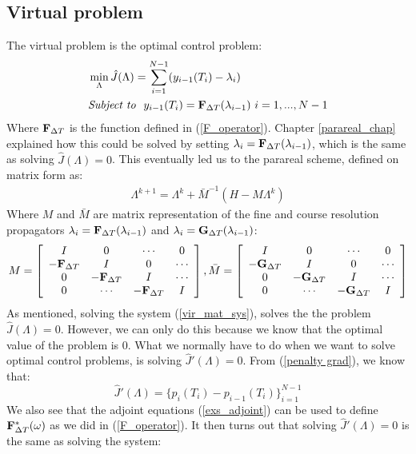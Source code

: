\subsection{Virtual problem}
The virtual problem is the optimal control problem:
\begin{align}
&\min_{\Lambda}\hat{J}(\Lambda) = \sum_{i=1}^{N-1} (y_{i-1}(T_{i})-\lambda_{i}) \label{virtual_func} \\
&\textit{Subject to } \ y_{i-1}(T_{i}) = \bold F_{\Delta T}(\lambda_{i-1}) \ i=1,...,N-1 \label{virtual}
\end{align}
Where $\bold F_{\Delta T}$ is the function defined in (\ref{F_operator}). Chapter \ref{parareal_chap} explained how this could be solved by setting $\lambda_i= \bold F_{\Delta T}(\lambda_{i-1})$, which is the same as solving $\hat{J}(\Lambda)=0$. This eventually led us to the parareal scheme, defined on matrix form as:
\begin{align*}
\Lambda^{k+1} = \Lambda^k + \bar{M}^{-1}(H-M\Lambda^k)
\end{align*}
Where $M$ and $\bar{M}$ are matrix representation of the fine and course resolution propagators $\lambda_i= \bold F_{\Delta T}(\lambda_{i-1})$ and  $\lambda_i= \bold G_{\Delta T}(\lambda_{i-1})$:
\begin{align*}
M = \left[ \begin{array}{cccc}
   I & 0 & \cdots & 0 \\  
   -\bold{F}_{\Delta T} & I & 0 & \cdots \\ 
   0 &-\bold{F}_{\Delta T} & I  & \cdots \\
   0 &\cdots &-\bold{F}_{\Delta T} & I   \\
   \end{array}  \right],
\bar{M} = \left[ \begin{array}{cccc}
   I & 0 & \cdots & 0 \\  
   -\bold{G}_{\Delta T} & I & 0 & \cdots \\ 
   0 &-\bold{G}_{\Delta T} & I  & \cdots \\
   0 &\cdots &-\bold{G}_{\Delta T} & I   \\
   \end{array}  \right]
\end{align*}
As mentioned, solving the system (\ref{vir_mat_sys}), solves the the problem $\hat{J}(\Lambda)=0$. However, we can only do this because we know that the optimal value of the problem is $0$. What we normally have to do when we want to solve optimal control problems, is solving $\hat{J}'(\Lambda)=0$. From (\ref{penalty grad}), we know that: $$\hat{J}'(\Lambda) = \{p_i(T_i)-p_{i-1}(T_i)\}_{i=1}^{N-1}$$ We also see that the adjoint equations (\ref{exs_adjoint}) can be used to define $\bold{F}_{\Delta T}^*(\omega)$ as we did in (\ref{F_operator}). It then turns out that solving $\hat{J}'(\Lambda)=0$ is the same as solving the system:
